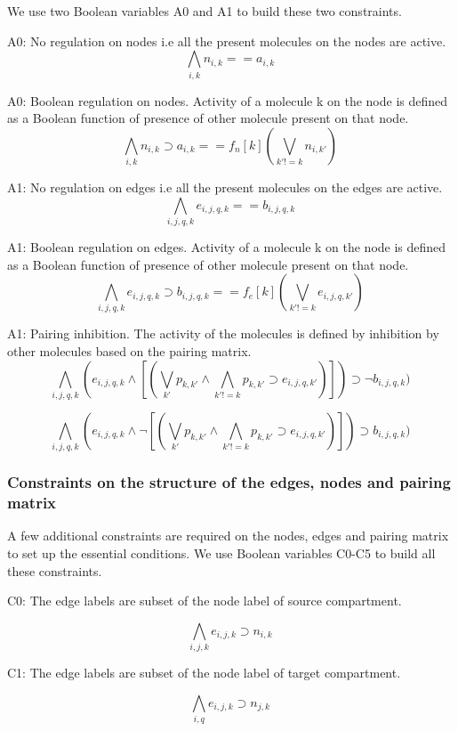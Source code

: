 We use two Boolean variables A0 and A1 to build these two constraints. \newline

A0: No regulation on nodes i.e all the present molecules on the nodes are active.
\[ \bigwedge\limits_{i,k} n_{i,k} == a_{i,k} \, \]  

A0: Boolean regulation on nodes. Activity of a molecule k on the node is defined as a Boolean function of presence of other molecule present on that node.
\[ \bigwedge\limits_{i,k} n_{i,k} \supset a_{i,k} ==   f_n[k] (\bigvee_{ k' != k} n_{i,k'}) \, \]

A1: No regulation on edges i.e all the present molecules on the edges are active.
\[ \bigwedge\limits_{i,j,q,k} e_{i,j,q,k} == b_{i,j,q,k} \, \]    

A1: Boolean regulation on edges. Activity of a molecule k on the node is defined as a Boolean function of presence of other molecule present on that node.
\[ \bigwedge\limits_{i,j,q,k} e_{i,j,q,k} \supset b_{i,j,q,k} == f_e[k](\bigvee_{k' != k} e_{i,j,q,k'}) \, \]  

A1: Pairing inhibition. The activity of the molecules is defined by inhibition by other molecules based on the pairing matrix. 
\[ \bigwedge\limits_{i,j,q, k}  (e_{i,j,q,k} \land [ ( \bigvee_{k'} p_{k,k'} \land \bigwedge_{k' != k} p_{k,k'} \supset e_{i,j,q,k'})] ) \supset \neg b_{i,j,q,k}) \, \]  

\[ \bigwedge\limits_{i,j, q, k}  (e_{i,j,q,k} \land \neg [ ( \bigvee_{k'} p_{k,k'} \land \bigwedge_{k' != k} p_{k,k'} \supset e_{i,j,q,k'})] ) \supset b_{i,j,q,k}) \, \]  

\subsubsection{Constraints on the structure of the edges, nodes and pairing matrix}
A few additional constraints are required on the nodes, edges and pairing matrix to set up the essential conditions. We use Boolean variables C0-C5 to build all these constraints.

C0: The edge labels are subset of the node label of source compartment.

\[ \bigwedge\limits_{i,j,k} e_{i,j,k} \supset n_{i,k} \, \]  

C1: The edge labels are subset of the node label of target compartment.

\[ \bigwedge\limits_{i,q}  e_{i,j,k} \supset n_{j,k} \, \]  

